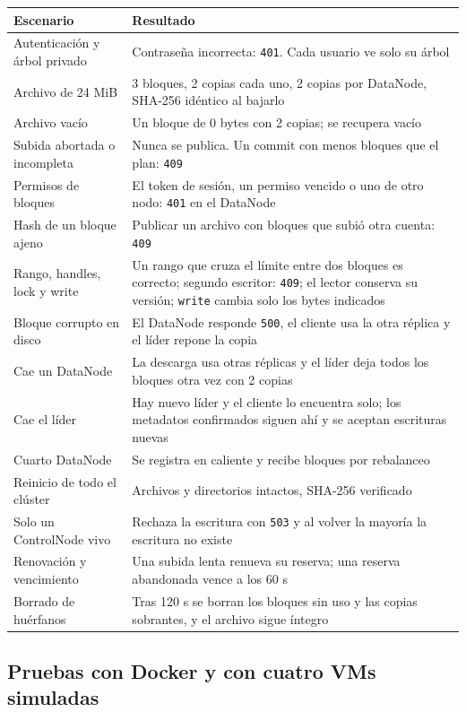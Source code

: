 \documentclass[10pt]{article}
\begin{document}
\begin{xltabular}{\linewidth}{@{}L{6.0cm}Y@{}}
\toprule
Escenario & Resultado \\
\midrule\endhead
Autenticación y árbol privado & Contraseña incorrecta: \texttt{401}. Cada usuario ve solo su árbol \\
Archivo de 24 MiB & 3 bloques, 2 copias cada uno, 2 copias por DataNode, SHA-256 idéntico al bajarlo \\
Archivo vacío & Un bloque de 0 bytes con 2 copias; se recupera vacío \\
Subida abortada o incompleta & Nunca se publica. Un commit con menos bloques que el plan: \texttt{409} \\
Permisos de bloques & El token de sesión, un permiso vencido o uno de otro nodo: \texttt{401} en el DataNode \\
Hash de un bloque ajeno & Publicar un archivo con bloques que subió otra cuenta: \texttt{409} \\
Rango, handles, lock y write & Un rango que cruza el límite entre dos bloques es correcto; segundo escritor: \texttt{409}; el lector conserva su versión; \texttt{write} cambia solo los bytes indicados \\
Bloque corrupto en disco & El DataNode responde \texttt{500}, el cliente usa la otra réplica y el líder repone la copia \\
Cae un DataNode & La descarga usa otras réplicas y el líder deja todos los bloques otra vez con 2 copias \\
Cae el líder & Hay nuevo líder y el cliente lo encuentra solo; los metadatos confirmados siguen ahí y se aceptan escrituras nuevas \\
Cuarto DataNode & Se registra en caliente y recibe bloques por rebalanceo \\
Reinicio de todo el clúster & Archivos y directorios intactos, SHA-256 verificado \\
Solo un ControlNode vivo & Rechaza la escritura con \texttt{503} y al volver la mayoría la escritura no existe \\
Renovación y vencimiento & Una subida lenta renueva su reserva; una reserva abandonada vence a los 60 s \\
Borrado de huérfanos & Tras 120 s se borran los bloques sin uso y las copias sobrantes, y el archivo sigue íntegro \\
\bottomrule
\end{xltabular}

\subsection{Pruebas con Docker y con cuatro VMs simuladas}
\end{document}
